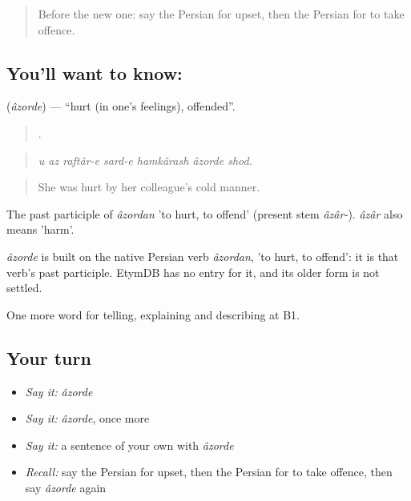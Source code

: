 \label{lesson:FA-C482-azorde}



\begin{quote}
Before the new one: say the Persian for upset, then the Persian for to take offence.
\end{quote}

\subsection*{You'll want to know: }
\textbf{} (\emph{âzorde}) — \textquotedblleft{}hurt (in one's feelings), offended\textquotedblright{}.

\begin{quote}
      .
\end{quote}

\begin{quote}
\emph{u az raftâr-e sard-e hamkârash âzorde shod.}
\end{quote}

\begin{quote}
She was hurt by her colleague's cold manner.
\end{quote}

The past participle of \emph{âzordan} 'to hurt, to offend' (present stem \emph{âzâr-}). \emph{âzâr} also means 'harm'.

\begin{cousinweb}
\emph{âzorde} is built on the native Persian verb \emph{âzordan}, 'to hurt, to offend': it is that verb's past participle. EtymDB has no entry for it, and its older form is not settled.
\end{cousinweb}

\begin{grammarlens}[title={What you've built}]
One more word for telling, explaining and describing at B1.
\end{grammarlens}

\subsection*{Your turn}
\begin{itemize}
\raggedright
  \item \emph{Say it:} \emph{âzorde}
  \item \emph{Say it:} \emph{âzorde}, once more
  \item \emph{Say it:} a sentence of your own with \emph{âzorde}
  \item \emph{Recall:} say the Persian for upset, then the Persian for to take offence, then say \emph{âzorde} again
\end{itemize}

